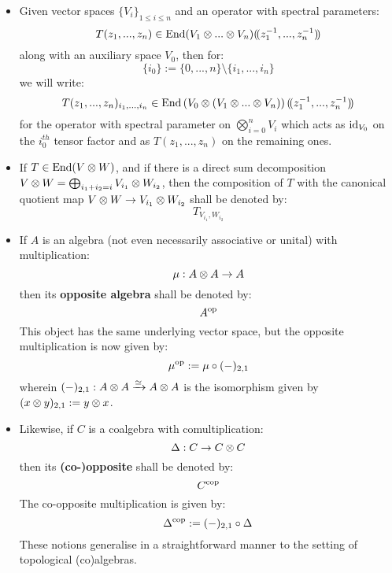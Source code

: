         \begin{convention} \label{conv: tensor_notations}
            \begin{itemize}
                \item Given vector spaces $\{V_i\}_{1 \leq i \leq n}$ and an operator with spectral parameters:
                    $$T(z_1, ..., z_n) \in \End(V_1 \tensor ... \tensor V_n)(\!(z_1^{-1}, ..., z_n^{-1})\!)$$
                along with an auxiliary space $V_0$, then for:
                    $$\{i_0\} := \{0, ..., n\} \setminus \{i_1, ..., i_n\}$$
                we will write:
                    \begin{equation} \label{equation: tensor_factor_notation}
                        T(z_1, ..., z_n)_{i_1, ..., i_n} \in \End\left(V_0 \tensor (V_1 \tensor ... \tensor V_n)\right)(\!(z_1^{-1}, ..., z_n^{-1})\!)
                    \end{equation}
                for the operator with spectral parameter on $\bigotimes_{i = 0}^n V_i$ which acts as $\mathrm{id}_{V_0}$ on the $i_0^{th}$ tensor factor and as $T(z_1, ..., z_n)$ on the remaining ones.
                \item If $T \in \End(V \tensor W)$, and if there is a direct sum decomposition $V \tensor W = \bigoplus_{i_1 + i_2 = i} V_{i_1} \tensor W_{i_2}$, then the composition of $T$ with the canonical quotient map $V \tensor W \to V_{i_1} \tensor W_{i_2}$ shall be denoted by:
                    $$T_{V_{i_1}, W_{i_2}}$$
            \end{itemize}
        \end{convention}

        \begin{convention}
            \begin{itemize}
                \item If $A$ is an algebra (not even necessarily associative or unital) with multiplication:
                    $$\mu: A \tensor A \to A$$
                then its \textbf{opposite algebra} shall be denoted by:
                    $$A^{\mathrm{op}}$$
                This object has the same underlying vector space, but the opposite multiplication is now given by:
                    $$\mu^{\mathrm{op}} := \mu \circ (-)_{2, 1}$$
                wherein $(-)_{2, 1}: A \tensor A \xrightarrow[]{\cong} A \tensor A$ is the isomorphism given by $(x \tensor y)_{2, 1} := y \tensor x$.
                \item Likewise, if $C$ is a coalgebra with comultiplication:
                    $$\Delta: C \to C \tensor C$$
                then its \textbf{(co-)opposite} shall be denoted by:
                    $$C^{\mathrm{cop}}$$
                The co-opposite multiplication is given by:
                    $$\Delta^{\mathrm{cop}} := (-)_{2, 1} \circ \Delta$$
                These notions generalise in a straightforward manner to the setting of topological (co)algebras.
            \end{itemize}
        \end{convention}

